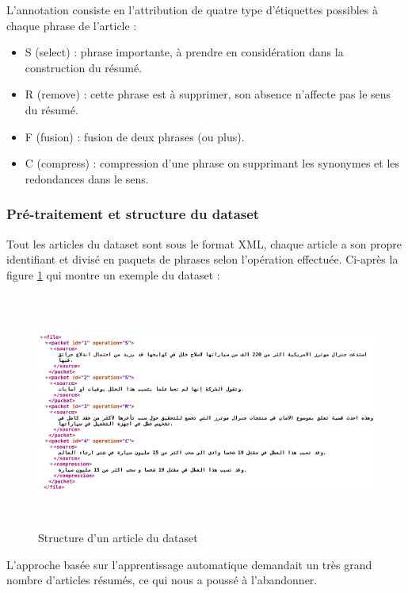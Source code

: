         L'annotation consiste en l'attribution de quatre type d’étiquettes possibles à chaque phrase de l'article :
            \begin{itemize}
                \item S (select) : phrase importante, à prendre en considération dans la construction du résumé.
                \item R (remove) : cette phrase est à supprimer, son absence n'affecte pas le sens du résumé.
                \item F (fusion) : fusion de deux phrases (ou plus).
                \item C (compress) : compression d'une phrase on supprimant les synonymes et les redondances dans le sens.\\
            \end{itemize}

        \subsubsection{Pré-traitement et structure du dataset}
        Tout les articles du dataset sont sous le format XML, chaque article a son propre identifiant et divisé en paquets de phrases selon l'opération effectuée. Ci-après la figure \ref{xml-structure} qui montre un exemple du dataset : 
        \begin{figure}[H]
            \centering
            \includegraphics[height=220pt,width=430pt]{img/chapter4/xml.png}
            \caption{Structure d'un article du dataset}
            \label{xml-structure}
        \end{figure}
        L'approche basée sur l'apprentissage automatique demandait un très grand nombre d'articles résumés, ce qui nous a poussé à l'abandonner.

